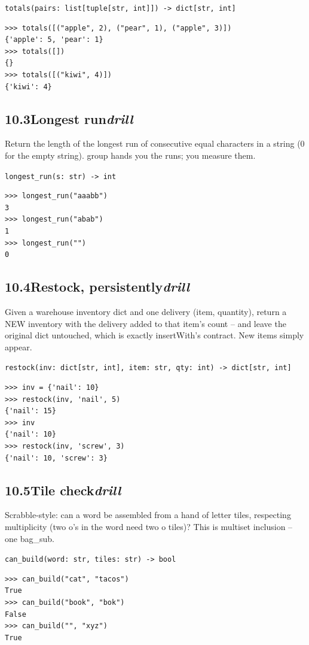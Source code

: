 \documentclass[10pt,letterpaper]{book}
\begin{document}
\noindent\texttt{totals(pairs: list[tuple[str, int]]) -> dict[str, int]}
\begin{lstlisting}[style=ex]
>>> totals([("apple", 2), ("pear", 1), ("apple", 3)])
{'apple': 5, 'pear': 1}
>>> totals([])
{}
>>> totals([("kiwi", 4)])
{'kiwi': 4}
\end{lstlisting}
\subsection*{10.3\quad Longest run\hfill\textnormal{\textit{drill}}}
Return the length of the longest run of consecutive equal characters in a string (0 for the empty string). group hands you the runs; you measure them.

\noindent\texttt{longest\_run(s: str) -> int}
\begin{lstlisting}[style=ex]
>>> longest_run("aaabb")
3
>>> longest_run("abab")
1
>>> longest_run("")
0
\end{lstlisting}
\subsection*{10.4\quad Restock, persistently\hfill\textnormal{\textit{drill}}}
Given a warehouse inventory dict and one delivery (item, quantity), return a NEW inventory with the delivery added to that item's count -- and leave the original dict untouched, which is exactly insertWith's contract. New items simply appear.

\noindent\texttt{restock(inv: dict[str, int], item: str, qty: int) -> dict[str, int]}
\begin{lstlisting}[style=ex]
>>> inv = {'nail': 10}
>>> restock(inv, 'nail', 5)
{'nail': 15}
>>> inv
{'nail': 10}
>>> restock(inv, 'screw', 3)
{'nail': 10, 'screw': 3}
\end{lstlisting}
\subsection*{10.5\quad Tile check\hfill\textnormal{\textit{drill}}}
Scrabble-style: can a word be assembled from a hand of letter tiles, respecting multiplicity (two o's in the word need two o tiles)? This is multiset inclusion -- one bag\_sub.

\noindent\texttt{can\_build(word: str, tiles: str) -> bool}
\begin{lstlisting}[style=ex]
>>> can_build("cat", "tacos")
True
>>> can_build("book", "bok")
False
>>> can_build("", "xyz")
True
\end{lstlisting}
\end{document}
